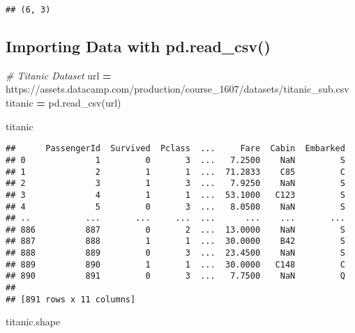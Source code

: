 \documentclass[
]{book}
\newenvironment{Shaded}{\begin{snugshade}}{\end{snugshade}}
\newcommand{\CommentTok}[1]{\textcolor[rgb]{0.56,0.35,0.01}{\textit{#1}}}
\newcommand{\NormalTok}[1]{#1}
\newcommand{\OperatorTok}[1]{\textcolor[rgb]{0.81,0.36,0.00}{\textbf{#1}}}
\newcommand{\StringTok}[1]{\textcolor[rgb]{0.31,0.60,0.02}{#1}}
\begin{document}
\begin{verbatim}
## (6, 3)
\end{verbatim}

\hypertarget{importing-data-with-pd.read_csv}{%
\subsection{Importing Data with pd.read\_csv()}\label{importing-data-with-pd.read_csv}}

\begin{Shaded}
\begin{Highlighting}[]
\CommentTok{\# Titanic Dataset}
\NormalTok{url }\OperatorTok{=} \StringTok{\textquotesingle{}https://assets.datacamp.com/production/course\_1607/datasets/titanic\_sub.csv\textquotesingle{}}
\NormalTok{titanic }\OperatorTok{=}\NormalTok{ pd.read\_csv(url)}
\end{Highlighting}
\end{Shaded}

\begin{Shaded}
\begin{Highlighting}[]
\NormalTok{titanic}
\end{Highlighting}
\end{Shaded}

\begin{verbatim}
##      PassengerId  Survived  Pclass  ...     Fare  Cabin  Embarked
## 0              1         0       3  ...   7.2500    NaN         S
## 1              2         1       1  ...  71.2833    C85         C
## 2              3         1       3  ...   7.9250    NaN         S
## 3              4         1       1  ...  53.1000   C123         S
## 4              5         0       3  ...   8.0500    NaN         S
## ..           ...       ...     ...  ...      ...    ...       ...
## 886          887         0       2  ...  13.0000    NaN         S
## 887          888         1       1  ...  30.0000    B42         S
## 888          889         0       3  ...  23.4500    NaN         S
## 889          890         1       1  ...  30.0000   C148         C
## 890          891         0       3  ...   7.7500    NaN         Q
## 
## [891 rows x 11 columns]
\end{verbatim}

\begin{Shaded}
\begin{Highlighting}[]
\NormalTok{titanic.shape}
\end{Highlighting}
\end{Shaded}
\end{document}
